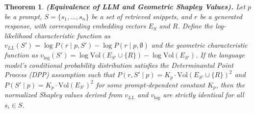 \documentclass{article}
\newtheorem{theorem}{Theorem}
\begin{document}
\begin{theorem}\label{thm:equi}
\textbf{(Equivalence of LLM and Geometric Shapley Values).} 
\textit{Let $p$ be a prompt, $S = \{s_1, \dots, s_n\}$ be a set of retrieved snippets, and $r$ be a generated response, with corresponding embedding vectors $E_S$ and $R$. Define the log-likelihood characteristic function as $v_{LL}(S') = \log P(r \mid p, S') - \log P(r \mid p, \emptyset)$ and the geometric characteristic function as $v_{\log}(S') = \log \text{Vol}(E_{S'} \cup \{R\}) - \log \text{Vol}(E_{S'})$. If the language model's conditional probability distribution satisfies the Determinantal Point Process (DPP) assumption such that $P(r, S' \mid p) = K_p \cdot \text{Vol}(E_{S'} \cup \{R\})^2$ and $P(S' \mid p) = K_p \cdot \text{Vol}(E_{S'})^2$ for some prompt-dependent constant $K_p$, then the normalized Shapley values derived from $v_{LL}$ and $v_{\log}$ are strictly identical for all $s_i \in S$.}
\end{theorem}
\end{document}
